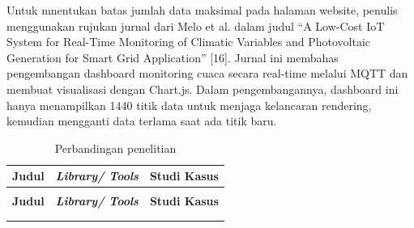 Untuk mnentukan batas jumlah data maksimal pada halaman website, penulis menggunakan rujukan jurnal dari Melo et al. dalam judul “A Low-Cost IoT System for Real-Time Monitoring of Climatic Variables and Photovoltaic Generation for Smart Grid Application” [16]. Jurnal ini membahas pengembangan dashboard monitoring cuaca secara real-time melalui MQTT dan membuat visualisasi dengan Chart.js. Dalam pengembangannya, dashboard ini hanya menampilkan 1440 titik data untuk menjaga kelancaran rendering, kemudian mengganti data terlama saat ada titik baru. 

\begin{longtable}{|p{}|
		p{}|
		p{}|}
	\caption{Perbandingan penelitian} \label{t_risetPemodelan} \\
	\hline
	\textbf{Judul} & \textbf{\textit{Library/ Tools }} & \textbf{Studi Kasus} \\ \hline
	\endfirsthead
	
	\multicolumn{3}{c}{} \\ \hline
	\textbf{Judul} & \textbf{\textit{Library/ Tools }} & \textbf{Studi Kasus} \\ \hline
	\endhead
	
	\hline \multicolumn{3}{r}{ } \\ 
	\endfoot
	
	\hline
	\endlastfoot
	

\end{longtable}
